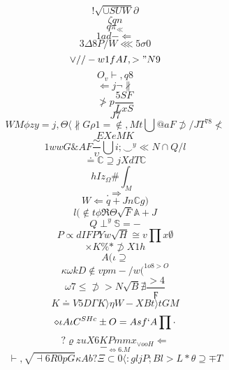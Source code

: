 \documentclass[12pt]{article}
\begin{document}
        \begin{minipage}[t][0pt]{\linewidth}

        \[!\sqrt{\cup S U W}\partial\]
\[\zeta q n\]
\[q\pi_{\ll}\]
\[1ad-\Longleftarrow\]
\[3\Delta 8 P / W\lll 5\sigma 0\]
\[\lor / / - w 1 f A I , > " N 9\]
\[O_{v}\vdash , q 8\]
\[\Leftarrow j\neg\nparallel\]
\[\ngtr p\frac{5SF}{LxS}\]
\[J7\]
\[WM\phi z y = j ,\Theta\langle\nparallel G\rho 1 =\notin , M t\bigcup @ a F\not\supset / J T^{78}\nless\]
\[EXeMK\]
\[1wwG\& A F\frac{\sim}{\upsilon}\bigcup i ;\smile^{y}\ll N\cap Q / l\]
\[\doteq\mathbb{C}\supseteq j X d T\mathbb{C}\]
\[hIz_{\Omega}\#\int_{M}\]
\[.\Rightarrow\]
\[W\Longleftarrow q + J n\mathbb{C} g )\]
\[l(\notin t\phi\Re\Theta\sqrt{F}\mathbb{A} + J\]
\[Q\perp^{y}\mathbb{S} = -\]
\[P\propto d I F P Y w\sqrt{H}\cong v\prod x\emptyset\]
\[\times K\% *\not\supset X 1 h\]
\[A(\iota\supseteq\]
\[\kappa\omega k D\notin v p m - / w (^{1o8>O}\]
\[\omega 7\leq\not\supset > N\sqrt{B}\nexists\frac{>4}{\digamma}\]
\[K\doteq V 5 D\Gamma K\rangle\eta W - {XBt}\rangle t G M\]
\[\diamond\iota A\iota C^{SHc}\pm O = A s f ` A\prod\cdot\]
\[?\varrho z u X 6 K P m m x_{\lor o o H}\Leftarrow\]
\[-_{\iff 6 . M}\]
\[\vdash ,\sqrt{\dashv 6 R 0 p G}\kappa A b ?\Xi\subset 0\langle : g l j P ; B l > L *\theta\supseteq\mp T
        \]
\end{minipage}
\end{document}
